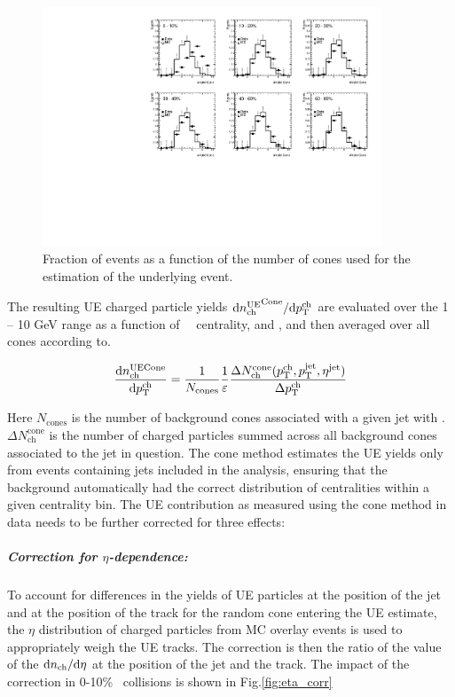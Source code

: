 \begin{figure}[ht]
     \centerline{
        \includegraphics[width=0.9\textwidth]{figures/main/UE/cone_stats}
     }
     \caption{Fraction of events as a function of the number of cones used for the estimation of the underlying event.}
     \label{fig:cone_stats}
  \end{figure}   

The resulting UE charged particle yields $\mathrm{d} \mbox{$n_{\mathrm{ch}}^{\mathrm{UE}}$}^{\mathrm{Cone}}/ \mathrm{d} \mbox{$p_{{\mathrm{T}}}^{\mathrm{ch}}$}$ are evaluated over the 1 -- 10 GeV range as a function of \pt\, \ptjet\, centrality, and \rvar, and then averaged over all cones according to.

 \begin{eqnarray}
\frac{\mathrm{d} n_{\mathrm{ch}}^{\mathrm{UE Cone}}}{\mathrm{d} \mbox{$p_{{\mathrm{T}}}^{\mathrm{ch}}$}}  = \frac{1}{N_{\mathrm{cones}}} \frac{1}{\varepsilon} \frac{\Delta N^{\mathrm{cone}}_{\mathrm{ch}} (\mbox{$p_{{\mathrm{T}}}^{\mathrm{ch}}$}, \mbox{$p_{\mathrm{T}}^{\mathrm{jet}}$}, \mbox{$\eta^{\mathrm{jet}}$})}{\Delta \mbox{$p_{{\mathrm{T}}}^{\mathrm{ch}}$}}
 \end{eqnarray}

Here $N_{\mathrm{cones}}$ is the number of background cones associated with a given jet with \ptjet.
$\Delta N^{\mathrm{cone}}_{\mathrm{ch}}$ is the number of charged particles summed across all background cones associated to the jet in question.
The cone method estimates the UE yields only from events containing jets included in the analysis, ensuring that the background automatically had the correct distribution of centralities within a given centrality bin.
The UE contribution as measured using the cone method in data needs to be further corrected for three effects:
 \subparagraph{Correction for $\eta$-dependence: } To account for differences in the yields of UE particles at the position of the jet and at the position of the track for the random cone entering the UE estimate, the $\eta$ distribution of charged particles from MC overlay events is used to appropriately weigh the UE tracks.
The correction is then the ratio of the value of the $\mathrm{d} \mbox{$n_{\mathrm{ch}}$} / \mathrm{d}\eta$ at the position of the jet and the track.
The impact of the correction in 0-10\% \pbpb\ collisions is shown in Fig.\ref{fig:eta_corr}

